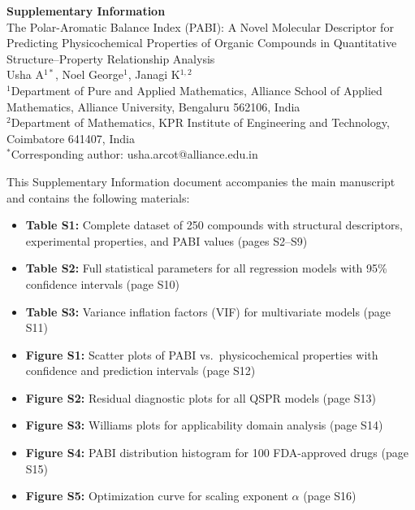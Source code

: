 \documentclass[12pt,a4paper]{article}
\begin{document}
\begin{center}
{\LARGE\textbf{Supplementary Information}}\\[0.8cm]
{\Large The Polar-Aromatic Balance Index (PABI): A Novel Molecular Descriptor for Predicting Physicochemical Properties of Organic Compounds in Quantitative Structure--Property Relationship Analysis}\\[0.6cm]
{\large Usha A$^{1*}$, Noel George$^{1}$, Janagi K$^{1,2}$}\\[0.3cm]
{\small $^{1}$Department of Pure and Applied Mathematics, Alliance School of Applied Mathematics, Alliance University, Bengaluru 562106, India\\
$^{2}$Department of Mathematics, KPR Institute of Engineering and Technology, Coimbatore 641407, India\\
$^{*}$Corresponding author: usha.arcot@alliance.edu.in}
\end{center}

\vspace{1cm}

\noindent This Supplementary Information document accompanies the main manuscript and contains the following materials:

\begin{itemize}[leftmargin=2em]
\item \textbf{Table S1:} Complete dataset of 250 compounds with structural descriptors, experimental properties, and PABI values (pages S2--S9)
\item \textbf{Table S2:} Full statistical parameters for all regression models with 95\% confidence intervals (page S10)
\item \textbf{Table S3:} Variance inflation factors (VIF) for multivariate models (page S11)
\item \textbf{Figure S1:} Scatter plots of PABI vs.\ physicochemical properties with confidence and prediction intervals (page S12)
\item \textbf{Figure S2:} Residual diagnostic plots for all QSPR models (page S13)
\item \textbf{Figure S3:} Williams plots for applicability domain analysis (page S14)
\item \textbf{Figure S4:} PABI distribution histogram for 100 FDA-approved drugs (page S15)
\item \textbf{Figure S5:} Optimization curve for scaling exponent $\alpha$ (page S16)
\end{itemize}
\end{document}
